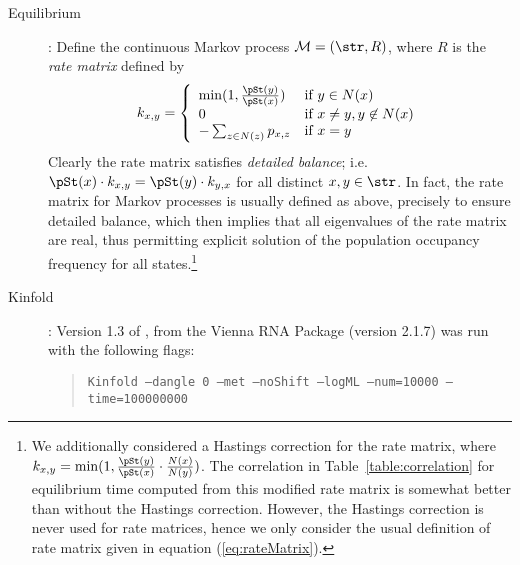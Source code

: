 \begin{description}
\item[Equilibrium]: Define the continuous Markov process
$\mathcal{M}=(\str,R)$, where $R$ is the {\em rate matrix} defined
by
\begin{align}
\label{eq:rateMatrix} k_{x,y} = \left\{
\begin{array}{ll}

\min(1, \frac{\pSt(y)}{\pSt(x)} ) &\mbox{if $y \in N(x)$}\\
0 &\mbox{if $x \ne y, y \not\in N(x)$}\\
- \sum_{\substack{z \in N(z)}} p_{x,z} &\mbox{if $x=y$}\\
\end{array}
\right.
\end{align}
Clearly the rate matrix satisfies {\em detailed balance}; i.e. $\pSt(x)
\cdot k_{x,y} = \pSt(y) \cdot k_{y,x}$ for all distinct $x,y \in
\str$. In fact, the rate matrix for Markov processes is usually
defined as above, precisely to ensure detailed balance, which then
implies that all eigenvalues of the rate matrix are real, thus
permitting explicit solution of the population occupancy frequency for
all states.\footnote{We additionally considered a Hastings correction
for the rate matrix, where $k_{x,y} = \min(1, \frac{\pSt(y)}{\pSt(x)}
\cdot \frac{N(x)}{N(y)})$. The correlation in
Table~\ref{table:correlation} for equilibrium time computed from this
modified rate matrix is somewhat better than without the Hastings
correction. However, the Hastings correction is never used for rate
matrices, hence we only consider the usual definition of rate matrix
given in equation (\ref{eq:rateMatrix}).}

\item[Kinfold]: Version 1.3 of \kinfold \citep{Flamm:00a}, from
the Vienna RNA Package (version 2.1.7) was run with the following
flags:
\begin{quote}
{\tt Kinfold --dangle 0 --met --noShift --logML --num=10000
--time=100000000}


\end{quote}
\end{description}

